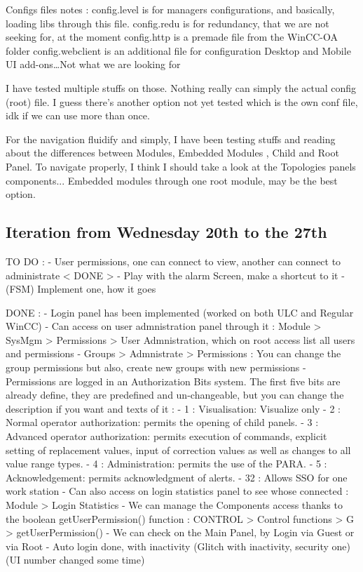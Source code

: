\documentclass[a4paper, 10pt]{article}
\begin{document}
Configs files notes : 
config.level is for managers configurations, and basically, loading libs through this file.
config.redu is for redundancy, that we are not seeking for, at the moment
config.http is a premade file from the WinCC-OA folder
config.webclient is an additional file for configuration Desktop and Mobile UI add-ons\dots Not what we are looking for

I have tested multiple stuffs on those. Nothing really can simply the actual config (root) file.
I guess there's another option not yet tested which is the own conf file, idk if we can use more than once.

For the navigation fluidify and simply, I have been testing stuffs and reading about the differences between Modules, Embedded Modules , Child and Root Panel.
To navigate properly, I think I should take a look at the Topologies panels components...
Embedded modules through one root module, may be the best option.

\subsection*{Iteration from Wednesday 20th to the 27th}
TO DO : - User permissions, one can connect to view, another can connect to administrate < DONE >
        - Play with the alarm Screen, make a shortcut to it
        - (FSM) Implement one, how it goes

DONE :  - Login panel has been implemented (worked on both ULC and Regular WinCC)
        - Can access on user admnistration panel through it : Module > SysMgm > Permissions > User Admnistration, which on root access list all users and permissions
        - Groups > Admnistrate > Permissions : You can change the group permissions but also, create new groups with new permissions
        - Permissions are logged in an Authorization Bits system. The first five bits are already define, they are predefined and un-changeable, but you can change the description if you want and texts of it : 
            - 1 : Visualisation: Visualize only
            - 2 : Normal operator authorization: permits the opening of child panels.
            - 3 : Advanced operator authorization: permits execution of commands, explicit setting of replacement values, input of correction values as well as changes to all value range types.
            - 4 : Administration: permits the use of the PARA.
            - 5 : Acknowledgement: permits acknowledgment of alerts.
            - 32 : Allows SSO for one work station
        - Can also access on login statistics panel to see whose connected : Module > Login Statistics
        - We can manage the Components access thanks to the boolean getUserPermission() function : CONTROL > Control functions > G > getUserPermission()
        - We can check on the Main Panel, by Login via Guest or via Root
        - Auto login done, with inactivity (Glitch with inactivity, security one) (UI number changed some time)
\end{document}
